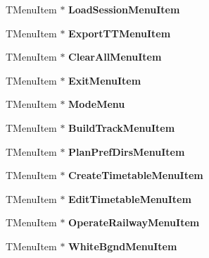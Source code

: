 \begin{DoxyCompactItemize}
\item 
\mbox{\label{class_t_interface_aa62edd983f6ff1f2d0d68f48c6aaeda0}} 
T\+Menu\+Item $\ast$ {\bfseries Load\+Session\+Menu\+Item}
\item 
\mbox{\label{class_t_interface_a81b00a53a2e0591baf3589bb4c5b3793}} 
T\+Menu\+Item $\ast$ {\bfseries Export\+T\+T\+Menu\+Item}
\item 
\mbox{\label{class_t_interface_afd79ba734c2b134f0279b72d6606db22}} 
T\+Menu\+Item $\ast$ {\bfseries Clear\+All\+Menu\+Item}
\item 
\mbox{\label{class_t_interface_a9e147ffa9214458e6ea4838748da9a63}} 
T\+Menu\+Item $\ast$ {\bfseries Exit\+Menu\+Item}
\item 
\mbox{\label{class_t_interface_acd9d9b1f2e9f370f2e36d21dba083a61}} 
T\+Menu\+Item $\ast$ {\bfseries Mode\+Menu}
\item 
\mbox{\label{class_t_interface_a0eae9e0686e45636f0c41ad79bbdb728}} 
T\+Menu\+Item $\ast$ {\bfseries Build\+Track\+Menu\+Item}
\item 
\mbox{\label{class_t_interface_a82e2f2e9a73b05e43112c57a3d297886}} 
T\+Menu\+Item $\ast$ {\bfseries Plan\+Pref\+Dirs\+Menu\+Item}
\item 
\mbox{\label{class_t_interface_ae75664e06a36b87e941850337aa1bf30}} 
T\+Menu\+Item $\ast$ {\bfseries Create\+Timetable\+Menu\+Item}
\item 
\mbox{\label{class_t_interface_a1657e4071f56177d4152ea08bc814b16}} 
T\+Menu\+Item $\ast$ {\bfseries Edit\+Timetable\+Menu\+Item}
\item 
\mbox{\label{class_t_interface_ad47a6d3170286d961a53e6d26823ecbf}} 
T\+Menu\+Item $\ast$ {\bfseries Operate\+Railway\+Menu\+Item}
\item 
\mbox{\label{class_t_interface_ae68c6a19c4d5dee4c613011760d9f514}} 
T\+Menu\+Item $\ast$ {\bfseries White\+Bgnd\+Menu\+Item}

\end{DoxyCompactItemize}
